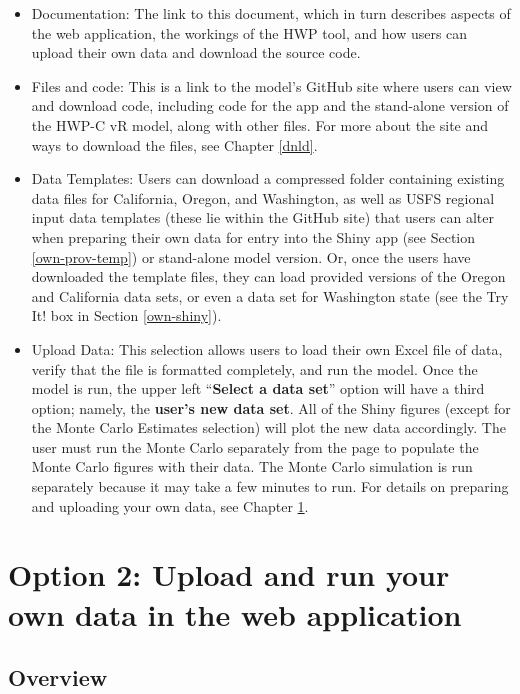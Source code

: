 \documentclass[
  openany]{book}
\begin{document}
\begin{itemize}
\item
  Documentation: The link to this document, which in turn describes aspects of the web application, the workings of the HWP tool, and how users can upload their own data and download the source code.
\item
  Files and code: This is a link to the model's GitHub site where users can view and download code, including code for the app and the stand-alone version of the HWP-C vR model, along with other files. For more about the site and ways to download the files, see Chapter \ref{dnld}.
\item
  Data Templates: Users can download a compressed folder containing existing data files for California, Oregon, and Washington, as well as USFS regional input data templates (these lie within the GitHub site) that users can alter when preparing their own data for entry into the Shiny app (see Section \ref{own-prov-temp}) or stand-alone model version. Or, once the users have downloaded the template files, they can load provided versions of the Oregon and California data sets, or even a data set for Washington state (see the Try It! box in Section \ref{own-shiny}).
\item
  Upload Data: This selection allows users to load their own Excel file of data, verify that the file is formatted completely, and run the model. Once the model is run, the upper left ``\textbf{Select a data set}'' option will have a third option; namely, the \textbf{user's new data set}. All of the Shiny figures (except for the Monte Carlo Estimates selection) will plot the new data accordingly. The user must run the Monte Carlo separately from the page to populate the Monte Carlo figures with their data. The Monte Carlo simulation is run separately because it may take a few minutes to run. For details on preparing and uploading your own data, see Chapter \ref{own}.
\end{itemize}

\hypertarget{own}{%
\chapter{Option 2: Upload and run your own data in the web application}\label{own}}

\hypertarget{own-over}{%
\section{Overview}\label{own-over}}
\end{document}
